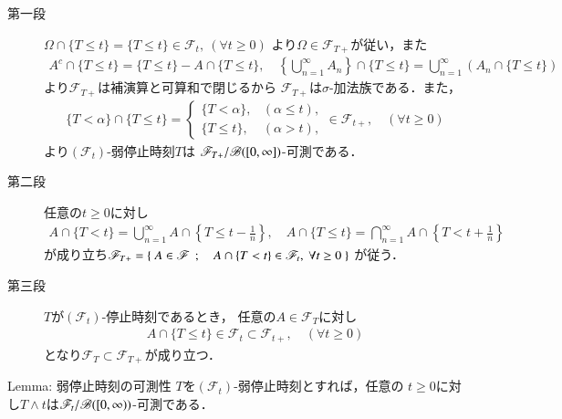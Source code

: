 	\begin{prf}\mbox{}
		\begin{description}
			\item[第一段]
				$\Omega \cap \{T \leq t\} = \{T \leq t\} \in \mathscr{F}_t,\ (\forall t \geq 0)$
				より$\Omega \in \mathscr{F}_{T+}$が従い，また
				\begin{align}
					A^c \cap \{T \leq t\} = \{T \leq t\} - A \cap \{T \leq t\},
					\quad \left\{ \bigcup_{n=1}^\infty A_n \right\} \cap \{T \leq t\}
					= \bigcup_{n=1}^\infty \left( A_n \cap \{T \leq t\} \right)
				\end{align}
				より$\mathscr{F}_{T+}$は補演算と可算和で閉じるから
				$\mathscr{F}_{T+}$は$\sigma$-加法族である．また，
				\begin{align}
					\{T < \alpha\} \cap \{T \leq t\}
					= \begin{cases}
						\{T < \alpha\}, & (\alpha \leq t), \\
						\{T \leq t\}, & (\alpha > t),
					\end{cases}
					\in \mathscr{F}_{t+},
					\quad (\forall t \geq 0)
				\end{align}
				より$(\mathscr{F}_t)$-弱停止時刻$T$は
				$\mathscr{F}_{T+}/\mathscr{B}([0,\infty])$-可測である．
				
			\item[第二段]
				任意の$t \geq 0$に対し
				\begin{align}
					A \cap \{T < t\} = \bigcup_{n=1}^\infty A \cap \left\{T \leq t - \frac{1}{n}\right\},
					\quad A \cap \{T \leq t\} = \bigcap_{n=1}^\infty A \cap \left\{T < t + \frac{1}{n}\right\}
				\end{align}
				が成り立ち$\mathscr{F}_{T+} = \left\{\ A \in \mathscr{F}\ \, ; \quad A \cap \{T < t\} \in \mathscr{F}_t,\ \forall t \geq 0\ \right\}$
				が従う．
			
			\item[第三段]
				$T$が$(\mathscr{F}_t)$-停止時刻であるとき，
				任意の$A \in \mathscr{F}_T$に対し
				\begin{align}
					A \cap \{T \leq t\} \in \mathscr{F}_t \subset \mathscr{F}_{t+},
					\quad (\forall t \geq 0)
				\end{align}
				となり$\mathscr{F}_T \subset \mathscr{F}_{T+}$が成り立つ．
				\QED
		\end{description}
	\end{prf}
	
	\begin{itembox}[l]{Lemma: 弱停止時刻の可測性}
		$T$を$(\mathscr{F}_t)$-弱停止時刻とすれば，任意の
		$t \geq 0$に対し$T \wedge t$は$\mathscr{F}_t/\mathscr{B}([0,\infty))$-可測である．
	\end{itembox}
	
